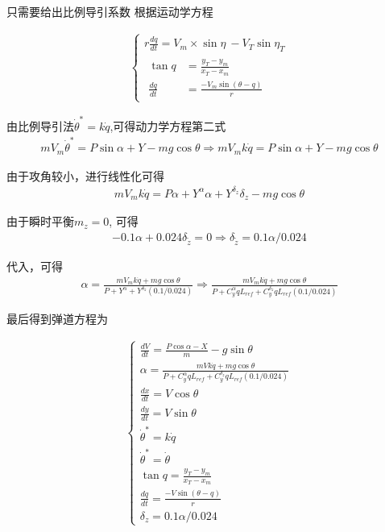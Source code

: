 \documentclass[UTF8]{ctexart}
\begin{document}

只需要给出比例导引系数
根据运动学方程

\begin{align}
    \begin{cases}
        r\frac{dq}{dt}=V_{m}\times\sin\eta\:-V_{T}\sin\eta_{T}                                                 \\
        \begin{aligned}\tan q&=\frac{y_T-y_m}{x_T-x_m}\\
        \frac{dq}{dt}&=\frac{-V_m\sin(\theta-q)}r\end{aligned}
    \end{cases}
\end{align}

由比例导引法$\dot{\theta}^*=k\dot{q}$,可得动力学方程第二式
\begin{align}
    mV_m\dot{\theta}^*=P\sin\alpha+Y-mg\cos\theta\Rightarrow mV_mk\dot{q}=P\sin\alpha+Y-mg\cos\theta
\end{align}

由于攻角较小，进行线性化可得
\begin{align}
    mV_{m}k\dot{q}=P\alpha+Y^{\alpha}\alpha+Y^{\delta_{z}}\delta_{z}-mg\cos\theta
\end{align}
    
由于瞬时平衡$m_z=0$, 可得
\begin{align}
    -0.1\alpha+0.024\delta_{\tilde{z}}=0\Rightarrow\delta_{\tilde{z}}=0.1\alpha/0.024
\end{align}

代入，可得
\begin{align}
    \alpha=\frac{mV_{m}k\dot{q}+mg\cos\theta}{P+Y^{\alpha}+Y^{\delta_{z}}(0.1/0.024)}\Rightarrow\frac{mV_{m}k\dot{q}+mg\cos\theta}{P+C_{y}^{\alpha}qL_{ref}+C_{y}^{\delta_{z}}qL_{ref}(0.1/0.024)}
\end{align}
    

最后得到弹道方程为

\begin{align}
    \begin{cases}
        \frac{dV}{dt}=\frac{P\cos\alpha-X}{m}-g\sin\theta  \\
        \alpha=\frac{mVk\dot{q}+mg\cos\theta}{P+C_{y}^{\alpha}qL_{ref}+C_{y}^{\delta_{z}}qL_{ref}(0.1/0.024)} \\
        \frac{dx}{dt}=V\cos\theta  \\
        {\frac{dy}{dt}}=V\sin\theta  \\
        \dot{\theta}^{*}=k\dot{q} \\
        \dot{\theta}^{*}=\dot{\theta} \\
        \tan q=\frac{y_{T}-y_{m}}{x_{T}-x_{m}} \\
        \frac{dq}{dt}=\frac{-V\sin(\theta-q)}{r} \\
        \delta_{z}=0.1\alpha/0.024
    \end{cases}
\end{align}
\end{document}

